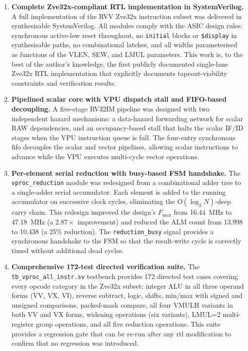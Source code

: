 \begin{enumerate}[label=\arabic*.]

  \item \textbf{Complete Zve32x-compliant RTL implementation in SystemVerilog.}
    A full implementation of the RVV Zve32x instruction subset was delivered in
    synthesisable SystemVerilog. All modules comply with the ASIC design rules:
    synchronous active-low reset throughout, no \texttt{initial} blocks or
    \texttt{\$display} in synthesisable paths, no combinational latches, and all
    widths parameterised as functions of the VLEN, SEW, and LMUL parameters.
    This work is, to the best of the author's knowledge, the first publicly documented
    single-lane Zve32x RTL implementation that explicitly documents tapeout-viability
    constraints and verification results.

  \item \textbf{Pipelined scalar core with VPU dispatch stall and FIFO-based decoupling.}
    A five-stage RV32IM pipeline was designed with two independent hazard mechanisms:
    a data-hazard forwarding network for scalar RAW dependencies, and an occupancy-based
    stall that halts the scalar IF/ID stages when the VPU instruction queue is full. The
    four-entry synchronous \gls{fifo} decouples the scalar and vector pipelines, allowing
    scalar instructions to advance while the VPU executes multi-cycle vector operations.

  \item \textbf{Per-element serial reduction with busy-based FSM handshake.}
    The \texttt{vproc\_reduction} module was redesigned from a combinational adder tree
    to a single-adder serial accumulator. Each element is added to the running accumulator
    on successive clock cycles, eliminating the $O(\log_2 N)$-deep carry chain. This
    redesign improved the design's $F_\text{max}$ from 16.44~MHz to 47.18~MHz (a
    $2.87\times$ improvement) and reduced the ALM count from 13,998 to 10,438 (a 25\%
    reduction). The \texttt{reduction\_busy} signal provides a synchronous handshake to
    the FSM so that the result-write cycle is correctly timed without additional dead cycles.

  \item \textbf{Comprehensive 172-test directed verification suite.}
    The \texttt{tb\_vproc\_all\_instr.sv} testbench provides 172 directed test cases
    covering every opcode category in the Zve32x subset: integer ALU in all three
    operand forms (VV, VX, VI), reverse subtract, logic, shifts, min/max with signed
    and unsigned comparisons, packed-mask compare, all four VMULH variants in both VV
    and VX forms, widening operations (six variants), LMUL=2 multi-register group
    operations, and all five reduction operations. This suite provides a regression
    gate that can be re-run after any \gls{rtl} modification to confirm that no
    regression was introduced.


\end{enumerate}
